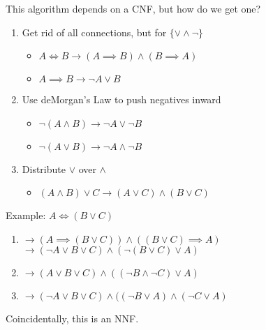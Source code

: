 \documentclass[../../lecture_notes.tex]{subfiles}
\begin{document}
\noindent This algorithm depends on a CNF, but how do we get one?
\begin{enumerate} [itemsep=0mm]
	\item Get rid of all connections, but for $\{\lor \land \neg\}$
		\begin{itemize} [itemsep=0mm]
			\item $A \iff B \rightarrow (A \implies B) \land (B \implies A) $
			\item $A \implies B \rightarrow \neg A \lor B$
		\end{itemize}
	\item Use deMorgan’s Law to push negatives inward
		\begin{itemize} [itemsep=0mm]	
			\item $\neg(A \land B) \rightarrow \neg A \lor \neg B$
			\item $\neg(A \lor B) \rightarrow \neg A \land \neg B$
		\end{itemize}
	\item Distribute $\lor$ over $\land$
		\begin{itemize} [itemsep=0mm]
			\item $(A \land B) \lor C \rightarrow (A \lor C) \land (B \lor C)$
		\end{itemize}
\end{enumerate}

Example: $A \iff (B \lor C)$
\begin{enumerate} [itemsep=0mm]
	\item $\rightarrow (A \implies (B \lor C)) \land ((B \lor C) \implies A)$
                  $\rightarrow (\neg A \lor B \lor C) \land (\neg(B \lor C) \lor A)$
	\item $\rightarrow (A \lor B \lor C) \land ((\neg B \land \neg C) \lor A)$
	\item $\rightarrow (\neg A \lor B \lor C) \land ((\neg B \lor A) \land (\neg C \lor A)$
\end{enumerate}
\noindent Coincidentally, this is an NNF.
\end{document}
